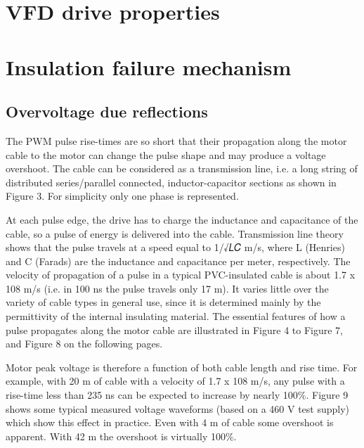 \section{VFD drive properties}

\section{Insulation failure mechanism}

\subsection{Overvoltage due reflections}

The PWM pulse rise-times are so short that their propagation along the motor cable to the motor can change the pulse shape and may produce a voltage overshoot. The cable can be considered as a transmission line, i.e. a long string of distributed series/parallel connected, inductor-capacitor sections as shown in Figure 3. For simplicity only one phase is represented.

At each pulse edge, the drive has to charge the inductance and capacitance of the cable, so a pulse of energy is delivered into the cable.
Transmission line theory shows that the pulse travels at a speed equal to 1/√𝐿𝐶 m/s, where L (Henries) and C (Farads) are the inductance and capacitance per meter, respectively. The velocity of propagation of a pulse in a typical PVC-insulated cable is about 1.7 x 108 m/s (i.e. in 100 ns the pulse travels only 17 m). It varies little over the variety of cable types in general use, since it is determined mainly by the permittivity of the internal insulating material.
The essential features of how a pulse propagates along the motor cable are illustrated in Figure 4 to Figure 7, and Figure 8 on the following pages.

Motor peak voltage is therefore a function of both cable length and rise time. For example, with 20 m of cable with a velocity of 1.7 x 108 m/s, any pulse with a rise-time less than 235 ns can
be expected to increase by nearly 100\%. Figure 9 shows some typical measured voltage waveforms (based on a 460 V test supply) which show this effect in practice. Even with 4 m of cable some overshoot is apparent. With 42 m the overshoot is virtually 100\%.

